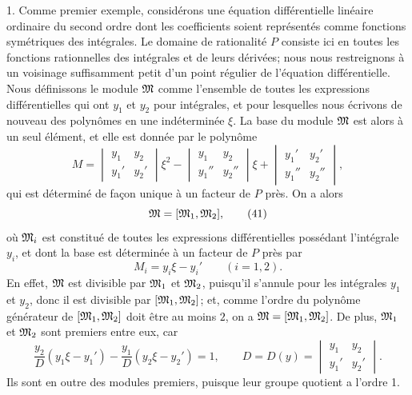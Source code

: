 1. Comme premier exemple, considérons une équation différentielle linéaire ordinaire du second ordre dont les coefficients soient représentés comme fonctions symétriques des intégrales. Le domaine de rationalité $P$ consiste ici en toutes les fonctions rationnelles des intégrales et de leurs dérivées; nous nous restreignons à un voisinage suffisamment petit d'un point régulier de l'équation différentielle. Nous définissons le module $\mathfrak{M}$ comme l'ensemble de toutes les expressions différentielles qui ont $y_1$ et $y_2$ pour intégrales, et pour lesquelles nous écrivons de nouveau des polynômes en une indéterminée $\xi$. La base du module $\mathfrak{M}$ est alors à un seul élément, et elle est donnée par le polynôme
\[
 M=
 \begin{vmatrix} y_1&y_2\\ y_1'&y_2'\end{vmatrix}\xi^2
 -\begin{vmatrix} y_1&y_2\\ y_1''&y_2''\end{vmatrix}\xi
 +\begin{vmatrix} y_1'&y_2'\\ y_1''&y_2''\end{vmatrix},
\]
qui est déterminé de façon unique à un facteur de $P$ près. On a alors
\begin{equation}
 \mathfrak{M}=[\mathfrak{M}_1,\mathfrak{M}_2],
\tag{41}
\end{equation}
où $\mathfrak{M}_i$ est constitué de toutes les expressions différentielles possédant l'intégrale $y_i$, et dont la base est déterminée à un facteur de $P$ près par
\[
 M_i=y_i\xi-y_i'\qquad(i=1,2).
\]
En effet, $\mathfrak{M}$ est divisible par $\mathfrak{M}_1$ et $\mathfrak{M}_2$, puisqu'il s'annule pour les intégrales $y_1$ et $y_2$, donc il est divisible par $[\mathfrak{M}_1,\mathfrak{M}_2]$; et, comme l'ordre du polynôme générateur de $[\mathfrak{M}_1,\mathfrak{M}_2]$ doit être au moins $2$, on a $\mathfrak{M}=[\mathfrak{M}_1,\mathfrak{M}_2]$. De plus, $\mathfrak{M}_1$ et $\mathfrak{M}_2$ sont premiers entre eux, car
\begin{equation}
 \frac{y_2}{D}(y_1\xi-y_1')-\frac{y_1}{D}(y_2\xi-y_2')=1,
 \qquad
 D=D(y)=\begin{vmatrix}y_1&y_2\\ y_1'&y_2'\end{vmatrix}.
\tag{42}
\end{equation}
Ils sont en outre des modules premiers, puisque leur groupe quotient a l'ordre 1.

